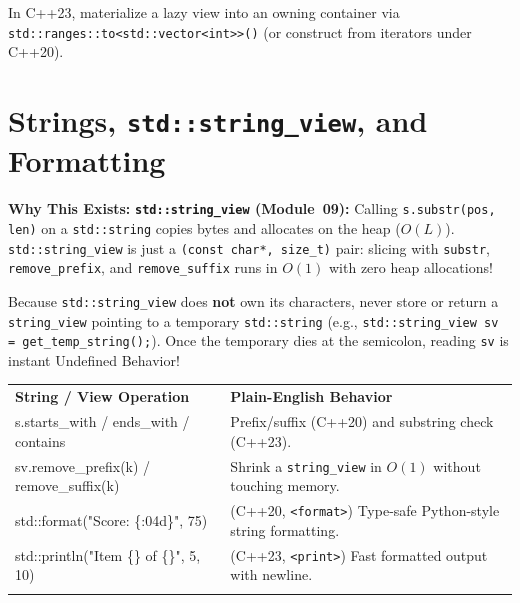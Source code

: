 \documentclass[11pt,a4paper]{article}
\newcommand{\whybeat}{\textbf{\color{accentteal}Why This Exists:} }
\begin{document}
In C++23, materialize a lazy view into an owning container via \texttt{std::ranges::to<std::vector<int>>()} (or construct from iterators under C++20).

\section{Strings, \texttt{std::string\_view}, and Formatting}

\whybeat \textbf{\texttt{std::string\_view} (Module~09):} Calling \texttt{s.substr(pos, len)} on a \texttt{std::string} copies bytes and allocates on the heap ($O(L)$). \texttt{std::string\_view} is just a \texttt{(const char*, size\_t)} pair: slicing with \texttt{substr}, \texttt{remove\_prefix}, and \texttt{remove\_suffix} runs in $O(1)$ with zero heap allocations!

\begin{watchoutbox}
Because \texttt{std::string\_view} does \textbf{not} own its characters, never store or return a \texttt{string\_view} pointing to a temporary \texttt{std::string} (e.g., \texttt{std::string\_view sv = get\_temp\_string();}). Once the temporary dies at the semicolon, reading \texttt{sv} is instant Undefined Behavior!
\end{watchoutbox}

\begingroup\small{}
\begin{tabularx}{\textwidth}{>{\raggedright\arraybackslash\ttfamily}p{4.3cm} >{\raggedright\arraybackslash}X}
\arrayrulecolor{primaryblue}\toprule[1.1pt]
\rowcolor{primaryblue!10}
\textcolor{primaryblue}{\normalfont\bfseries String / View Operation} & \textcolor{primaryblue}{\textbf{Plain-English Behavior}} \\
\arrayrulecolor{codeframe}\midrule[0.6pt]
s.starts\_with / ends\_with / contains & Prefix/suffix (C++20) and substring check (C++23). \\
sv.remove\_prefix(k) / remove\_suffix(k) & Shrink a \texttt{string\_view} in $O(1)$ without touching memory. \\
std::format("Score: \{:04d\}", 75) & (C++20, \texttt{<format>}) Type-safe Python-style string formatting. \\
std::println("Item \{\} of \{\}", 5, 10) & (C++23, \texttt{<print>}) Fast formatted output with newline. \\
\arrayrulecolor{primaryblue}\bottomrule[1.1pt]
\end{tabularx}\endgroup
\end{document}

